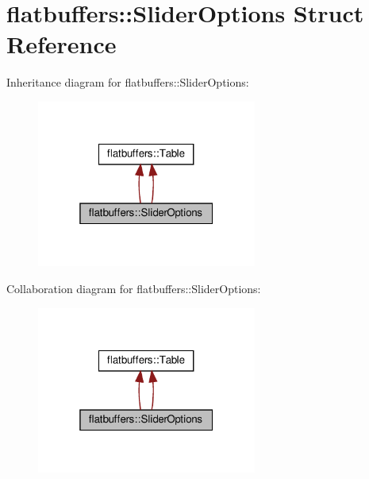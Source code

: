 \hypertarget{structflatbuffers_1_1SliderOptions}{}\section{flatbuffers\+:\+:Slider\+Options Struct Reference}
\label{structflatbuffers_1_1SliderOptions}


Inheritance diagram for flatbuffers\+:\+:Slider\+Options\+:
\nopagebreak
\begin{figure}[H]
\begin{center}
\leavevmode
\includegraphics[width=205pt]{structflatbuffers_1_1SliderOptions__inherit__graph}
\end{center}
\end{figure}


Collaboration diagram for flatbuffers\+:\+:Slider\+Options\+:
\nopagebreak
\begin{figure}[H]
\begin{center}
\leavevmode
\includegraphics[width=205pt]{structflatbuffers_1_1SliderOptions__coll__graph}
\end{center}
\end{figure}
